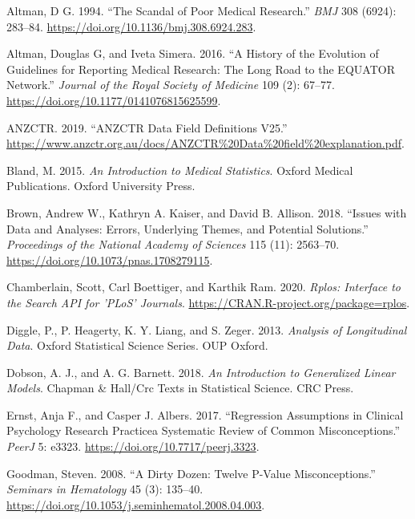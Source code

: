 \documentclass[
]{article}
\begin{document}
\leavevmode\hypertarget{ref-Altman1994}{}%
Altman, D G. 1994. ``The Scandal of Poor Medical Research.'' \emph{BMJ} 308 (6924): 283--84. \url{https://doi.org/10.1136/bmj.308.6924.283}.

\leavevmode\hypertarget{ref-Altman2016}{}%
Altman, Douglas G, and Iveta Simera. 2016. ``A History of the Evolution of Guidelines for Reporting Medical Research: The Long Road to the EQUATOR Network.'' \emph{Journal of the Royal Society of Medicine} 109 (2): 67--77. \url{https://doi.org/10.1177/0141076815625599}.

\leavevmode\hypertarget{ref-ANZCTR}{}%
ANZCTR. 2019. ``ANZCTR Data Field Definitions V25.'' \url{https://www.anzctr.org.au/docs/ANZCTR\%20Data\%20field\%20explanation.pdf}.

\leavevmode\hypertarget{ref-Bland2015}{}%
Bland, M. 2015. \emph{An Introduction to Medical Statistics}. Oxford Medical Publications. Oxford University Press.

\leavevmode\hypertarget{ref-Brown2018}{}%
Brown, Andrew W., Kathryn A. Kaiser, and David B. Allison. 2018. ``Issues with Data and Analyses: Errors, Underlying Themes, and Potential Solutions.'' \emph{Proceedings of the National Academy of Sciences} 115 (11): 2563--70. \url{https://doi.org/10.1073/pnas.1708279115}.

\leavevmode\hypertarget{ref-rplos}{}%
Chamberlain, Scott, Carl Boettiger, and Karthik Ram. 2020. \emph{Rplos: Interface to the Search API for 'PLoS' Journals}. \url{https://CRAN.R-project.org/package=rplos}.

\leavevmode\hypertarget{ref-Diggle2013}{}%
Diggle, P., P. Heagerty, K. Y. Liang, and S. Zeger. 2013. \emph{Analysis of Longitudinal Data}. Oxford Statistical Science Series. OUP Oxford.

\leavevmode\hypertarget{ref-Dobson2018}{}%
Dobson, A. J., and A. G. Barnett. 2018. \emph{An Introduction to Generalized Linear Models}. Chapman \& Hall/Crc Texts in Statistical Science. CRC Press.

\leavevmode\hypertarget{ref-Ernst2017}{}%
Ernst, Anja F., and Casper J. Albers. 2017. ``Regression Assumptions in Clinical Psychology Research Practicea Systematic Review of Common Misconceptions.'' \emph{PeerJ} 5: e3323. \url{https://doi.org/10.7717/peerj.3323}.

\leavevmode\hypertarget{ref-Goodman2008}{}%
Goodman, Steven. 2008. ``A Dirty Dozen: Twelve P-Value Misconceptions.'' \emph{Seminars in Hematology} 45 (3): 135--40. \url{https://doi.org/10.1053/j.seminhematol.2008.04.003}.
\end{document}
